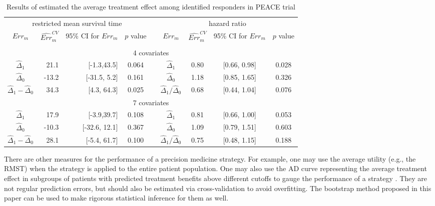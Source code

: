 \documentclass[12pt]{article}
\begin{document}
 

\begin{table}[ht]{
\centering
\setlength{\tabcolsep}{3pt}
\renewcommand{\arraystretch}{0.5}
\begin{tabular}{ crrc c cccc }
\hline
    \multicolumn{4}{c}{restricted mean survival time} & & \multicolumn{4}{c}{hazard ratio} \\
 $Err_m$  &  $\widehat{Err}_m^{CV}$ & 95\% CI for $Err_m$   & $p$ value & & $Err_m$ & $\widehat{Err}_m^{CV}$ & 95\% CI for $Err_m$   & $p$ value\\
    \cline{1-4} \cline{6-9}\\
 \multicolumn{9}{c}{4 covariates}\\
$\hat{\Delta}_1$ & 21.1 & [-1.3,43.5] & 0.064 && $\hat{\Delta}_1$ & 0.80 & [0.66, 0.98]& 0.028 \\ 
$\hat{\Delta}_0$   & -13.2 & [-31.5, 5.2]& 0.161 && $\hat{\Delta}_0$ & 1.18 & [0.85, 1.65]& 0.326 \\
$\hat{\Delta}_1-\hat{\Delta}_0$ & 34.3 & [4.3, 64.3] & 0.025 && $\hat{\Delta}_1/\hat{\Delta}_0$ & 0.68 & [0.44, 1.04] &  0.076  \\
 \multicolumn{9}{c}{7 covariates}\\
$\hat{\Delta}_1$ & 17.9 & [-3.9,39.7] & 0.108 && $\hat{\Delta}_1$ & 0.81 & [0.66, 1.00]& 0.053 \\ 
$\hat{\Delta}_0$   & -10.3 & [-32.6, 12.1]& 0.367 && $\hat{\Delta}_0$ & 1.09 & [0.79, 1.51]& 0.603 \\
$\hat{\Delta}_1-\hat{\Delta}_0$ & 28.1 & [-5.4, 61.7] & 0.100 && $\hat{\Delta}_1/\hat{\Delta}_0$ & 0.75 & [0.48, 1.15] &  0.188  \\
\end{tabular}
\caption{Results of estimated the average treatment effect among identified responders in PEACE trial} \label{tab:peace}}
\end{table}

There are other measures for the performance of a precision medicine strategy.  For example, one may use the average utility (e.g., the RMST) when the strategy is applied to the entire patient population.  One may also use the AD curve representing the average treatment effect in subgroups of patients with predicted treatment benefits above different cutoffs to gauge the performance of a strategy \cite{zhao2013effectively, pellegrini2020proof}. They are not regular prediction errors, but should also be estimated via cross-validation to avoid overfitting.  The bootstrap method proposed in this paper can be used to make rigorous statistical inference for them as well.
\end{document}
